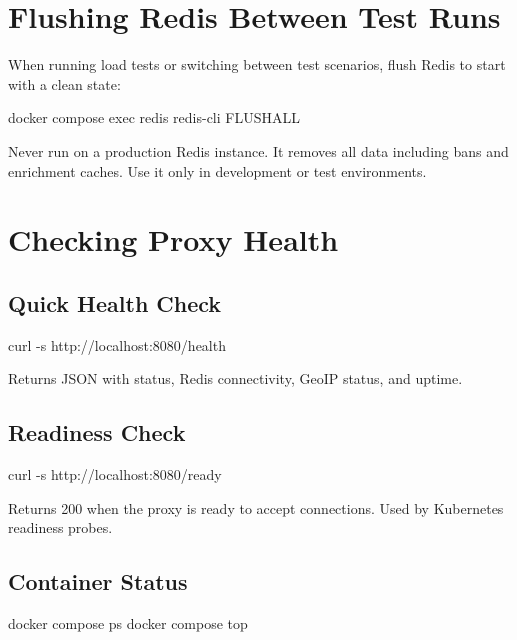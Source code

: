 \section{Flushing Redis Between Test Runs}

When running load tests or switching between test scenarios, flush Redis to
start with a clean state:

\begin{bashcode}
docker compose exec redis redis-cli FLUSHALL
\end{bashcode}

\begin{warningbox}
Never run  on a production Redis instance. It removes all data
including bans and enrichment caches. Use it only in development or test environments.
\end{warningbox}

\section{Checking Proxy Health}

\subsection{Quick Health Check}

\begin{bashcode}
curl -s http://localhost:8080/health
\end{bashcode}

Returns JSON with status, Redis connectivity, GeoIP status, and uptime.

\subsection{Readiness Check}

\begin{bashcode}
curl -s http://localhost:8080/ready
\end{bashcode}

Returns 200 when the proxy is ready to accept connections. Used by Kubernetes
readiness probes.

\subsection{Container Status}

\begin{bashcode}
docker compose ps
docker compose top
\end{bashcode}


